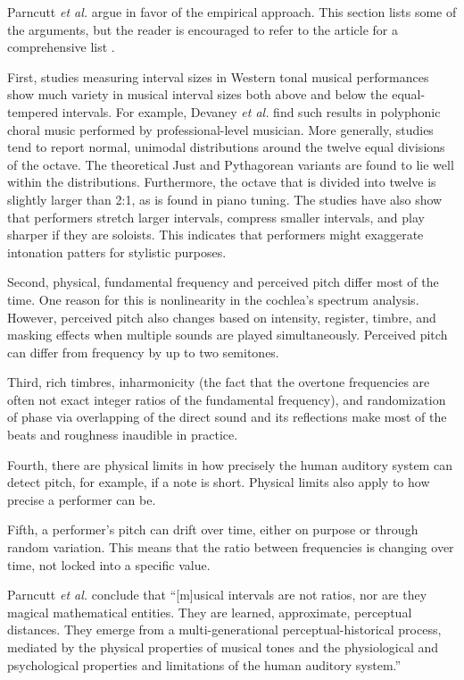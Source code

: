 Parncutt \textit{et al.} argue in favor of the empirical approach. This section lists some of the arguments, but the reader is encouraged to refer to the article for a comprehensive list \cite{parncutt2018psychocultural}. 

First, studies measuring interval sizes in Western tonal musical performances show much variety in musical interval sizes both above and below the equal-tempered intervals. For example, Devaney \textit{et al.} find such results in polyphonic choral music performed by professional-level musician. More generally, studies tend to report normal, unimodal distributions around the twelve equal divisions of the octave. The theoretical Just and Pythagorean variants are found to lie well within the distributions. Furthermore, the octave that is divided into twelve is slightly larger than 2:1, as is found in piano tuning. The studies have also show that performers stretch larger intervals, compress smaller intervals, and play sharper if they are soloists. This indicates that performers might exaggerate intonation patters for stylistic purposes. 

Second, physical, fundamental frequency and perceived pitch differ most of the time. One reason for this is nonlinearity in the cochlea’s spectrum analysis. However, perceived pitch also changes based on intensity, register, timbre, and masking effects when multiple sounds are played simultaneously. Perceived pitch can differ from frequency by up to two semitones. 

Third, rich timbres, inharmonicity (the fact that the overtone frequencies are often not exact integer ratios of the fundamental frequency), and randomization of phase via overlapping of the direct sound and its reflections make most of the beats and roughness inaudible in practice.

Fourth, there are physical limits in how precisely the human auditory system can detect pitch, for example, if a note is short. Physical limits also apply to how precise a performer can be.

Fifth, a performer's pitch can drift over time, either on purpose or through random variation. This means that the ratio between frequencies is changing over time, not locked into a specific value.

Parncutt \textit{et al.} conclude that ``[m]usical intervals are not ratios, nor are they magical mathematical entities. They are learned, approximate, perceptual distances. They emerge from a multi-generational perceptual-historical process, mediated by the physical properties of musical tones and the physiological and psychological properties and limitations of the human auditory system.''

